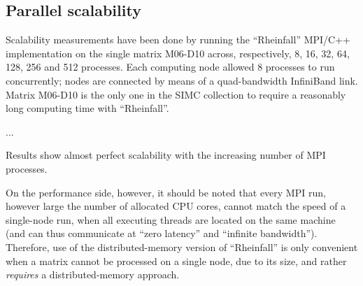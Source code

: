 \subsection{Parallel scalability}
\label{sec:scalability}

Scalability measurements have been done by running the ``Rheinfall''
MPI/C++ implementation on the single matrix \textsc{M06-D10} across,
respectively, 8, 16, 32, 64, 128, 256 and 512 processes.  Each
computing node allowed 8 processes to run concurrently; nodes are
connected by means of a quad-bandwidth InfiniBand link.  Matrix
\textsc{M06-D10} is the only one in the SIMC collection to require a
reasonably long computing time with ``Rheinfall''.

...

Results show almost perfect scalability with the increasing number of
MPI processes.

On the performance side, however, it should be noted that every MPI
run, however large the number of allocated CPU cores, cannot match the
speed of a single-node run, when all executing threads are located on
the same machine (and can thus communicate at ``zero latency'' and
``infinite bandwidth'').  Therefore, use of the distributed-memory
version of ``Rheinfall'' is only convenient when a matrix cannot be
processed on a single node, due to its size, and rather
\emph{requires} a distributed-memory approach.



